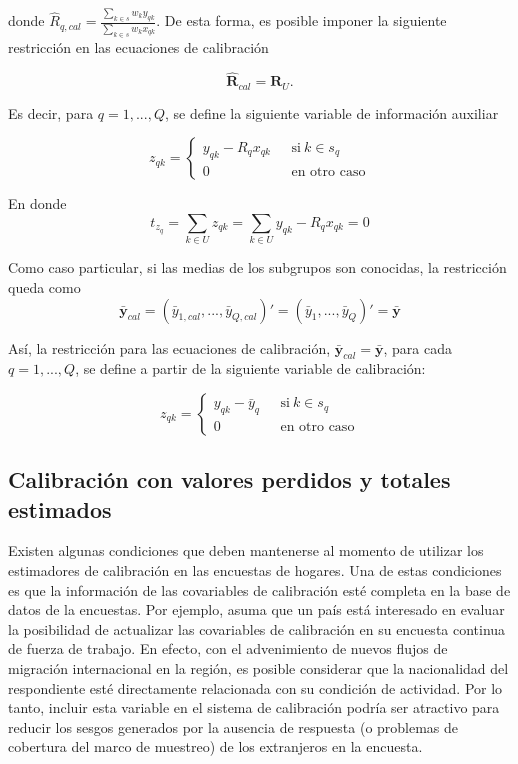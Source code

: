 \documentclass[
  12pt,
]{book}
\begin{document}
donde \(\hat{R}_{q,cal} = \frac{\sum_{k \in s}w_ky_{qk}}{\sum_{k \in s}w_kx_{qk}}\). De esta forma, es posible imponer la siguiente restricción en las ecuaciones de calibración

\[
\hat{\textbf{R}}_{cal} = \textbf{R}_U.
\]

Es decir, para \(q = 1,..., Q\), se define la siguiente variable de información auxiliar

\begin{equation*}
z_{qk} = 
\begin{cases} 
y_{qk} - R_qx_{qk} \ \ \ &\text{si} \ k \in s_q \\ 
0 &\text{en otro caso}
\end{cases}
\end{equation*}

En donde
\[
t_{z_q} = \sum_{k \in U}z_{qk} = \sum_{k \in U}y_{qk} - R_qx_{qk} = 0
\]

Como caso particular, si las medias de los subgrupos son conocidas, la restricción queda como
\[
\bar{\textbf{y}}_{cal} = (\bar{y}_{1,cal},...,\bar{y}_{Q,cal})' = (\bar{y}_{1},...,\bar{y}_{Q})' = \bar{\textbf{y}}
\]

Así, la restricción para las ecuaciones de calibración, \(\bar{\textbf{y}}_{cal} = \bar{\textbf{y}}\), para cada \(q = 1,...,Q\), se define a partir de la siguiente variable de calibración:

\begin{equation*}
z_{qk} = 
\begin{cases} 
y_{qk} - \bar{y}_{q} \ \ \ &\text{si} \ k \in s_q \\ 
0 &\text{en otro caso}
\end{cases}
\end{equation*}

\hypertarget{calibraciuxf3n-con-valores-perdidos-y-totales-estimados}{%
\subsection{Calibración con valores perdidos y totales estimados}\label{calibraciuxf3n-con-valores-perdidos-y-totales-estimados}}

Existen algunas condiciones que deben mantenerse al momento de utilizar los estimadores de calibración en las encuestas de hogares. Una de estas condiciones es que la información de las covariables de calibración esté completa en la base de datos de la encuestas. Por ejemplo, asuma que un país está interesado en evaluar la posibilidad de actualizar las covariables de calibración en su encuesta continua de fuerza de trabajo. En efecto, con el advenimiento de nuevos flujos de migración internacional en la región, es posible considerar que la nacionalidad del respondiente esté directamente relacionada con su condición de actividad. Por lo tanto, incluir esta variable en el sistema de calibración podría ser atractivo para reducir los sesgos generados por la ausencia de respuesta (o problemas de cobertura del marco de muestreo) de los extranjeros en la encuesta.
\end{document}
